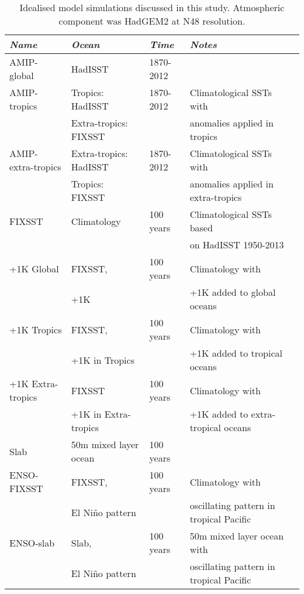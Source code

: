 \begin{center}
	\begin{table}[h]
		\caption{Idealised model simulations discussed in this study. Atmospheric 
		component was HadGEM2 at N48 resolution.}
		\label{tab:senseexp}
		\scriptsize
	\begin{tabular}{ l  l  l  l l}
		\textit{Name}		&  \textit{Ocean} & \textit{Time} &\textit{ Notes }\\ \hline
	AMIP-global &    HadISST & 1870-2012 &  \\
	AMIP-tropics	   & Tropics: HadISST & 1870-2012 & Climatological SSTs with \\
		&Extra-tropics: FIXSST&& anomalies applied in tropics \\
	AMIP-extra-tropics     & Extra-tropics: HadISST & 1870-2012 & 
		Climatological SSTs with \\
		& Tropics: FIXSST && anomalies applied in extra-tropics\\
		FIXSST    & Climatology & 100 years & Climatological SSTs based  \\
								  &&& on HadISST 1950-2013 \\
		+1K Global    & FIXSST,  & 100 years & Climatology with \\
												 & +1K && +1K added to global oceans \\
		+1K Tropics     & FIXSST, & 100 years & Climatology with \\
												 & +1K in Tropics && +1K added to 
		tropical oceans \\
		+1K Extra-tropics	   & FIXSST & 100 years &Climatology with \\
											& +1K in Extra-tropics && +1K added to 
		extra-tropical oceans \\
	Slab 	   & 50m mixed layer ocean & 100 years & \\
	ENSO-FIXSST    &  FIXSST, & 100 years & Climatology with \\
											& El Ni{\~n}o pattern && oscillating 
		pattern in tropical Pacific\\
	ENSO-slab    & Slab,  & 100 years & 50m mixed layer ocean with \\
											& El Ni{\~n}o pattern && oscillating 
		pattern in tropical Pacific\\
	\hline
	\end{tabular}
	\end{table}
\end{center}


